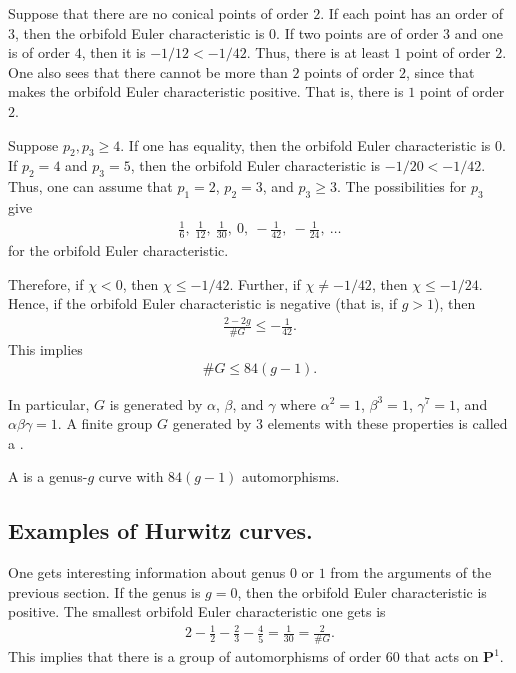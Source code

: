 \documentclass [11 pt, oneside] {article}
\begin{document}
\begin{esquisse}
Suppose that there are no conical points of order $2$. If each point has an order of $3$, then the orbifold Euler characteristic is $0$. If two points are of order $3$ and one is of order $4$, then it is $-1/12< -1/42$. Thus, there is at least $1$ point of order $2$. One also sees that there cannot be more than $2$ points of order $2$, since that makes the orbifold Euler characteristic positive. That is, there is $1$ point of order $2$.

Suppose $p_2,p_3\ge 4$. If one has equality, then the orbifold Euler characteristic is $0$. If $p_2=4$ and $p_3=5$, then the orbifold Euler characteristic is $-1/20<-1/42$. Thus, one can assume that $p_1=2$, $p_2=3$, and $p_3\ge 3$. The possibilities for $p_3$ give
\begin{align*}
	\frac{1}{6},\ \frac{1}{12},\ \frac{1}{30},\ 0, \ -\frac{1}{42},\  -\frac{1}{24},\ \hdots
\end{align*}
for the orbifold Euler characteristic.

Therefore, if $\chi<0$, then $\chi\le -1/42$. Further, if $\chi \ne -1/42$, then $\chi \le -1/24$. Hence, if the orbifold Euler characteristic is negative (that is, if $g>1$), then 
\begin{align*}
	\frac{2-2g}{\# G}\le -\frac{1}{42}.
\end{align*}
This implies
\begin{align*}
	\# G\le 84(g-1).
\end{align*}
\end{esquisse}
In particular, $G$ is generated by $\alpha$, $\beta$, and $\gamma$ where $\alpha^2=1$, $\beta^3=1$, $\gamma^7=1$, and $\alpha\beta\gamma=1$. A finite group $G$ generated by $3$ elements with these properties is called a .

 \begin{definition}[ ]\label{}\text{}
A  is a genus-$g$ curve with $84(g-1)$ automorphisms.
\end{definition}

\subsection{Examples of Hurwitz curves.}
One gets interesting information about genus $0$ or $1$ from the arguments of the previous section. If the genus is $g=0$, then the orbifold Euler characteristic is positive. The smallest orbifold Euler characteristic one gets is 
\begin{align*}
	2-\frac{1}{2}-\frac{2}{3}-\frac{4}{5}= \frac{1}{30} = \frac{2}{\# G}.
\end{align*}
This implies that there is a group of automorphisms of order $60$ that acts on $\mathbf{P}^1$. 
\end{document}
